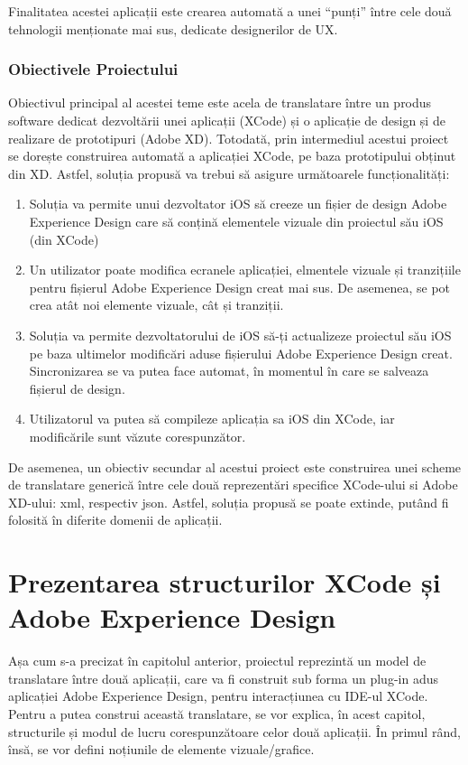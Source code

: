 Finalitatea acestei aplicații este crearea automată  a unei “punți” între cele două tehnologii menționate mai sus, dedicate designerilor de UX.

\subsection{Obiectivele Proiectului}
\label{sub-sec:proj-objectives}

Obiectivul principal al acestei teme este acela de translatare între un produs software dedicat dezvoltării unei aplicații (XCode) și o aplicație de design și de realizare de prototipuri (Adobe XD). Totodată, prin intermediul acestui proiect se dorește construirea automată a aplicației XCode, pe baza prototipului obținut din XD.
Astfel, soluția propusă va trebui să asigure următoarele funcționalități:

\begin{enumerate}
\item Soluția va permite unui dezvoltator iOS să creeze un fișier de design Adobe Experience Design care să conțină elementele vizuale din proiectul său iOS (din XCode)
\item Un utilizator poate modifica ecranele aplicației, elmentele vizuale și tranzițiile pentru fișierul Adobe Experience Design creat mai sus. De asemenea, se pot crea atât noi elemente vizuale, cât și tranziții.
\item Soluția va permite dezvoltatorului de iOS să-ți actualizeze proiectul său iOS pe baza ultimelor modificări aduse fișierului Adobe Experience Design creat. Sincronizarea se va putea face automat, în momentul în care se salveaza fișierul de design. 
\item  Utilizatorul va putea să compileze aplicația sa iOS din XCode, iar modificările sunt văzute corespunzător. 
\end{enumerate}

De asemenea, un obiectiv secundar al acestui proiect este construirea unei scheme de translatare generică între cele două reprezentări specifice XCode-ului si Adobe XD-ului: xml, respectiv json.
Astfel, soluția propusă se poate extinde, putând fi folosită în diferite domenii de aplicații.


\chapter{Prezentarea structurilor XCode și Adobe Experience Design}


Așa cum s-a precizat în capitolul anterior, proiectul reprezintă un model de translatare între două aplicații, care va fi construit sub forma un plug-in adus aplicației Adobe Experience Design, pentru interacțiunea cu IDE-ul XCode. 
Pentru a putea construi această translatare, se vor explica, în acest capitol, structurile și modul de lucru corespunzătoare celor două aplicații. În primul rând, însă, se vor defini noțiunile de elemente vizuale/grafice.

